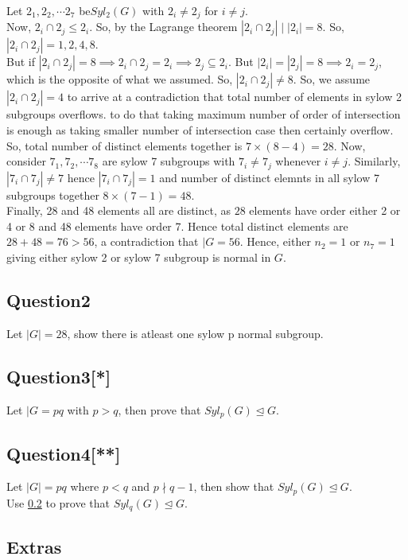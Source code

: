 \documentclass{article}
\begin{document}
Let $2_1,2_2,\cdots 2_7$ be$Syl_2(G)$ with $2_i \neq 2_j$ for $i \neq j$.\\
Now, $2_i \cap 2_j \leq 2_i$. So, by the Lagrange theorem $|2_i \cap 2_j|\mid |2_i|=8$. So, $|2_i\cap 2_j|=1,2,4,8$.\\
But if $|2_i\cap 2_j|=8 \implies 2_i \cap 2_j=2_i \implies 2_j\subseteq 2_i$. But $|2_i|=|2_j|=8 \implies 2_i=2_j$, which is the opposite of what we assumed.
So, $|2_i\cap 2_j|\neq 8$. So, we assume $|2_i\cap 2_j|=4$ to arrive at a contradiction that total number of elements in sylow 2 subgroups overflows. to do that taking maximum number of order of intersection is enough as taking smaller number of intersection case then certainly overflow. So, total number of distinct elements together is $7 \times (8-4)=28$.
Now, consider $7_1,7_2,\cdots 7_8$ are sylow 7 subgroups with $7_i\neq 7_j$ whenever $i\neq j$. Similarly, $|7_i\cap 7_j|\neq 7$ hence $|7_i\cap 7_j|=1$ and number of distinct elemnts in all sylow 7 subgroups together $8 \times (7-1)=48$.\\

Finally, 28 and 48 elements all are distinct, as $28$ elements have order either 2 or 4 or 8 and 48 elements have order 7. Hence total distinct elements are $28+48=76>56$, a contradiction that $|G=56$. Hence, either $n_2=1$ or $n_7=1$ giving either sylow 2 or sylow 7 subgroup is normal in $G$.

\subsection{Question2}
\label{subsec:q2}
Let $|G|=28$, show there is atleast one sylow p normal subgroup.

\subsection{Question3[*]}
\label{subsec:q3}
Let $|G=pq$ with $p>q$, then prove that $Syl_p(G) \trianglelefteq G$.

\subsection{Question4[**]}
\label{subsec:q4}
Let $|G|=pq$ where $p<q$ and $p \nmid q-1$, then show that $Syl_p(G) \trianglelefteq G.$\\
Use \cref{subsec:q3} to prove that $Syl_q(G) \trianglelefteq G$.

\subsection{Extras}
\label{subsec:extras}
\end{document}
